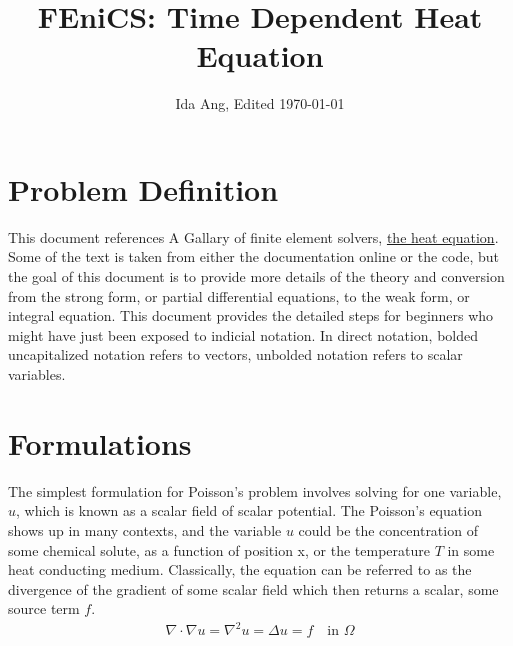\documentclass[12pt,3p]{article}
\begin{document}
\title{\Large{FEniCS: Time Dependent Heat Equation} \vspace{-2ex}}
\author{Ida Ang, Edited \today}
\date{\vspace{-5ex}}
\maketitle

\tableofcontents
\newpage
\section{Problem Definition}
\vspace{-2ex}
This document references A Gallary of finite element solvers, \href{https://fenicsproject.org/pub/tutorial/html/.\_ftut1006.html}{the heat equation}. Some of the text is taken from either the documentation online or the code, but the goal of this document is to provide more details of the theory and conversion from the strong form, or partial differential equations, to the weak form, or integral equation. This document provides the detailed steps for beginners who might have just been exposed to indicial notation. In direct notation, bolded uncapitalized notation refers to vectors, unbolded notation refers to scalar variables.
 
\section{Formulations}
\vspace{-2ex}
The simplest formulation for Poisson's problem involves solving for one variable, $u$, which is known as a scalar field of scalar potential. The Poisson's equation shows up in many contexts, and the variable $u$ could be the concentration of some chemical solute, as a function of position x, or the temperature $T$ in some heat conducting medium. Classically, the equation can be referred to as the divergence of the gradient of some scalar field which then returns a scalar, some source term $f$.
\begin{subequations}\label{EqPoisson}
\begin{align}
\nabla \cdot \nabla u = \nabla^2 u = \Delta u = f \quad \text{in } \Omega 
\end{align}
\end{subequations}
\end{document}
